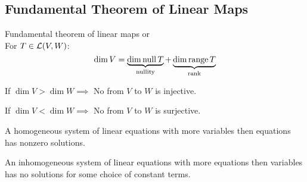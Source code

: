 \subsection{Fundamental Theorem of Linear Maps}
  \setcounter{thm}{20}
  \begin{thm}
    \label{rank-nullity-theorem}
    Fundamental theorem of linear maps or  \\
    For $T \in {\mathcal{L}(V,W)}$:
    \begin{equation}
      \dim V =
      \underbrace{ \dim \operatorname{null} T }_{\text{nullity}}
      + \underbrace{\dim \operatorname{range} T}_{\text{rank}}
    \end{equation}
  \end{thm}

  \setcounter{thm}{21}
  \begin{thm}
    If $\dim V > \dim W \implies$ No \lm from $V$ to $W$ is injective.
  \end{thm}

  \setcounter{thm}{23}
  \begin{thm}
    If $\dim V < \dim W \implies$ No \lm from $V$ to $W$ is surjective.
  \end{thm}

  \setcounter{thm}{25}
  \begin{thm}
    A homogeneous system of linear equations with more variables then equations has nonzero solutions.
  \end{thm}

  \setcounter{thm}{27}
  \begin{thm}
    An inhomogeneous system of linear equations with more equations then variables has no solutions for some choice of constant terms.
  \end{thm}
